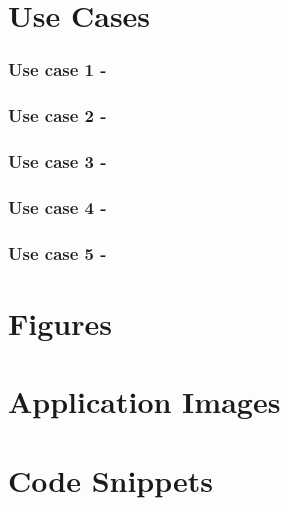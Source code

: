 \documentclass[12pt]{article}
\begin{document}
	
	
	\appendix
	\appendixpage
	\section{Use Cases}
	
	\begin{subappendices}
		
	\subsubsection{Use case 1 - }
	\subsubsection{Use case 2 - }
	\subsubsection{Use case 3 - }
	\subsubsection{Use case 4 - }
	\subsubsection{Use case 5 - }
	
	\end{subappendices}
	\section{Figures}
	
	\section{Application Images}
	\section{Code Snippets}
	
\end{document}
